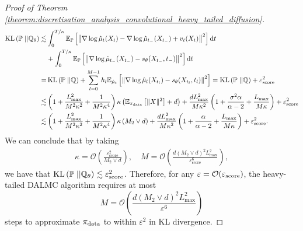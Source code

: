 \begin{proof}[Proof of Theorem \ref{theorem:discretisation_analysis_convolutional_heavy_tailed_diffusion}]
\begin{align*}
    \operatorname*{KL}\left(\mathbb{P}\;||\mathbb{Q}_\theta\right)\lesssim& \int_0^{T/\kappa}\mathbb{E}_{\mathbb{P}}\left[\left\Vert \nabla\log \hat{\mu}_t(X_t)-\nabla \log \hat{\mu}_{t_-}(X_{t_-}) + v_t(X_t)\right\Vert^2\right]\mathrm{d} t \\
    &+ \int_0^{T/\kappa}\mathbb{E}_{\mathbb{P}}\left[\left\Vert \nabla \log \hat{\mu}_{t_-}(X_{t_-}) - s_\theta(X_{t_-}, t_-)\right\Vert^2\right]\mathrm{d} t\\
    =& \operatorname*{KL}\left(\mathbb{P}\;||\mathbb{Q}\right)+ \sum_{l=0}^{M-1} h_l\mathbb{E}_{\hat{\mu}_t}\left[\left\Vert \nabla \log \hat{\mu}_l(X_{t_l}) - s_\theta(X_{t_l}, t_l)\right\Vert^2\right] =\operatorname*{KL}\left(\mathbb{P}\;||\mathbb{Q}\right)+\varepsilon_{\text{score}}^2\\
    \lesssim& \left(1+\frac{L_{\max}^2}{M^2\kappa^2}+\frac{1}{M^2\kappa^4}\right) \kappa \left(\mathbb{E}_{\operatorname*{\pi_{\text{data}}}}\left[\Vert X\Vert^2\right] + d\right) + \frac{d L_{\max}^2}{M\kappa^2}\left(1 + \frac{\sigma^2\alpha}{\alpha -2}+  \frac{L_{\max}}{M\kappa}\right)+\varepsilon_{\text{score}}^2\\
    \lesssim& \left(1+\frac{L_{\max}^2}{M^2\kappa^2}+\frac{1}{M^2\kappa^4}\right) \kappa \left(M_2 \vee d\right) + \frac{d L_{\max}^2}{M\kappa^2}\left(1 + \frac{\alpha}{\alpha -2}+  \frac{L_{\max}}{M\kappa}\right)+\varepsilon_{\text{score}}^2.
\end{align*}
We can conclude that by taking 
\begin{align*}
    \kappa = \mathcal{O}\left(\frac{\varepsilon_{\text{score}}^2}{M_2 \vee d}\right),\quad M = \mathcal{O}\left(\frac{d (M_2 \vee d)^2 L_{\max}^2}{\varepsilon_{\text{score}}^6}\right),
\end{align*}
we have that $\operatorname*{KL}\left(\mathbb{P}\;||\mathbb{Q}_\theta\right)\lesssim\varepsilon_{\text{score}}^2$. Therefore, for any $\varepsilon = \mathcal{O}(\varepsilon_{\operatorname*{\text{score}}})$, the heavy-tailed \gls*{DALMC} algorithm requires at most 
\begin{equation*}
     M = \mathcal{O}\left(\frac{d (M_2 \vee d)^2 L_{\max}^2}{\varepsilon^6}\right)
\end{equation*}
steps to approximate $\operatorname*{\pi_{\text{data}}}$ to within $\varepsilon^2$ in \gls*{KL} divergence.
\end{proof}